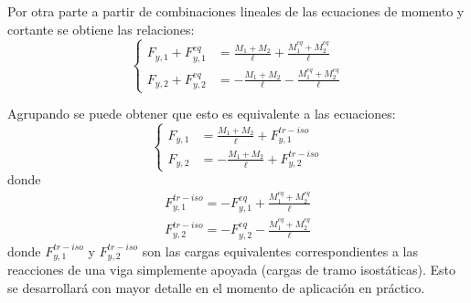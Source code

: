 
Por otra parte a partir de combinaciones lineales de las ecuaciones de momento y cortante se obtiene las relaciones:
%
\begin{equation}\label{eqn:eccortr}
\left\{
\begin{array}{rl}
\displaystyle
F_{y,1} + F_{y,1}^{eq} & \displaystyle
= \frac{M_1 + M_2}{\ell} + \frac{M_1^{eq} + M_2^{eq}}{\ell} \\[5mm]
\displaystyle
F_{y,2} + F_{y,2}^{eq} & \displaystyle
= -\frac{M_1 + M_2}{\ell} - \frac{M_1^{eq} + M_2^{eq}}{\ell}
\end{array}
\right.
\end{equation}
%

Agrupando se puede obtener que esto es equivalente a las ecuaciones:
%
\begin{equation}\label{eqn:eccortrB}
\boxed{
\left\{
\begin{array}{rl}
\displaystyle
F_{y,1} & \displaystyle
= \frac{M_1 + M_2}{\ell} + F_{y,1}^{tr-iso} \\[5mm]
\displaystyle
F_{y,2}  & \displaystyle
= -\frac{M_1 + M_2}{\ell} + F_{y,2}^{tr-iso} 
\end{array}
\right.
}
\end{equation}
%
donde
%
\begin{eqnarray}
F_{y,1}^{tr-iso} = - F_{y,1}^{eq} + \frac{M_1^{eq} + M_2^{eq}}{\ell} \nonumber\\ 
F_{y,2}^{tr-iso} = -F_{y,2}^{eq}- \frac{M_1^{eq} + M_2^{eq}}{\ell} \nonumber
\end{eqnarray}
%
donde $F_{y,1}^{tr-iso}$ y $F_{y,2}^{tr-iso}$ son las cargas equivalentes correspondientes a las reacciones de una viga simplemente apoyada (cargas de tramo isostáticas). %
%
Esto se desarrollará con mayor detalle en el momento de aplicación en práctico.


